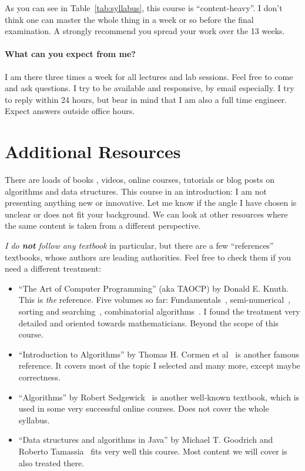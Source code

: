 \documentclass{aldast}
\begin{document}
As you can see in Table~\ref{tab:syllabus}, this course is
``content-heavy''. I don't think one can master the whole thing in a
week or so before the final examination. A strongly recommend you
spread your work over the 13 weeks.

\paragraph {What can you expect from me?}

I am there three times a week for all lectures and lab sessions. Feel
free to come and ask questions. I try to be available and responsive,
by email especially. I try to
reply within 24 hours, but bear in mind that I am also a full time
engineer. Expect answers outside office hours.


\section{Additional Resources}
\label{sec:resources}

There are loads of books
\cite{atto1974,melhorn2008,levitin2011,weiss2014,skiena2020}, videos,
online courses, tutorials or blog posts on algorithms and data
structures. This course in an introduction: I am not presenting
anything new or innovative. Let me know if the angle I have chosen is
unclear or does not fit your background. We can look at other
resources where the same content is taken from a different
perspective.

\emph{I do \textbf{not} follow any textbook} in particular, but there
are a few ``references'' textbooks, whose authors are leading
authorities. Feel free to check them if you need a different treatment:

\begin{itemize}
\item ``The Art of Computer Programming'' (aka TAOCP) by Donald
  E. Knuth. This is \emph{the} reference. Five volumes so far:
  Fundamentals~\cite{knuth1978}, semi-numerical~\cite{knuth1997},
  sorting and searching~\cite{knuth1998}, combinato\-rial
  al\-go\-ri\-thms~\cite{knuth2011}. I found the treatment very detailed
  and oriented towards mathematicians. Beyond the scope
  of this course.
\item ``Introduction to Algorithms'' by Thomas H. Cormen et
  al~\cite{cormen2009} is another famous reference. It covers most of
  the topic I selected and many more, except maybe correctness.
\item ``Algorithms'' by Robert Sedgewick~\cite{sedgewick2014} is another
  well-known textbook, which is used in some very successful online
  courses. Does not cover the whole syllabus.
\item ``Data structures and algorithms in Java'' by Michael
  T. Goodrich and Roberto Tamassia~\cite{goodrich2014} fits very well this
  course. Most content we will cover is also treated there.
\end{itemize}
\end{document}
